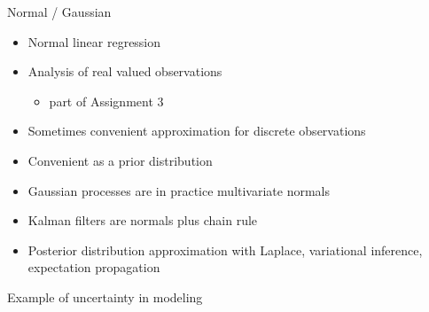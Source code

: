 \documentclass[finnish,english,t]{beamer}
\DeclareMathOperator{\normal}{normal}
\begin{document}
\begin{frame}{Normal / Gaussian}

  \begin{itemize}
  \item<+-> Normal linear regression%
  \item<+-> Analysis of real valued observations
    \begin{itemize}
    \item part of Assignment 3
    \end{itemize}
  \item<+-> Sometimes convenient approximation for discrete observations
  \item<+-> Convenient as a prior distribution
  \item<+-> Gaussian processes are in practice multivariate normals
  \item<+-> Kalman filters are normals plus chain rule
  \item<+-> Posterior distribution approximation with Laplace, variational
    inference, expectation propagation
  \end{itemize}
  
\end{frame}

\begin{frame}{Example of uncertainty in modeling}

  

\end{frame}

\end{document}
